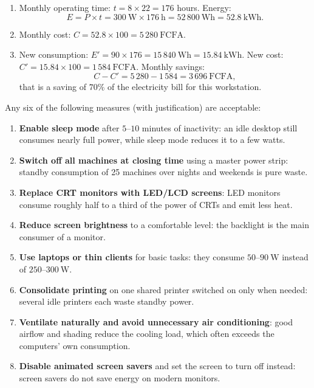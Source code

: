\documentclass[11pt]{article}
\begin{document}
\begin{corrige}
\begin{enumerate}
\item Monthly operating time: $t = 8 \times 22 = 176$ hours. Energy:
\[ E = P \times t = 300\ \mathrm{W} \times 176\ \mathrm{h} = 52\,800\ \mathrm{Wh} = 52.8\ \mathrm{kWh}. \]
\item Monthly cost: $C = 52.8 \times 100 = 5\,280\ \mathrm{FCFA}$.
\item New consumption: $E' = 90 \times 176 = 15\,840\ \mathrm{Wh} = 15.84\ \mathrm{kWh}$. New cost: $C' = 15.84 \times 100 = 1\,584\ \mathrm{FCFA}$. Monthly savings:
\[ C - C' = 5\,280 - 1\,584 = 3\,696\ \mathrm{FCFA}, \]
that is a saving of $70\%$ of the electricity bill for this workstation.
\end{enumerate}
\end{corrige}

\begin{corrige}
Any six of the following measures (with justification) are acceptable:
\begin{enumerate}
\item \textbf{Enable sleep mode} after $5$--$10$ minutes of inactivity: an idle desktop still consumes nearly full power, while sleep mode reduces it to a few watts.
\item \textbf{Switch off all machines at closing time} using a master power strip: standby consumption of 25 machines over nights and weekends is pure waste.
\item \textbf{Replace CRT monitors with LED/LCD screens}: LED monitors consume roughly half to a third of the power of CRTs and emit less heat.
\item \textbf{Reduce screen brightness} to a comfortable level: the backlight is the main consumer of a monitor.
\item \textbf{Use laptops or thin clients} for basic tasks: they consume $50$--$90\ \mathrm{W}$ instead of $250$--$300\ \mathrm{W}$.
\item \textbf{Consolidate printing} on one shared printer switched on only when needed: several idle printers each waste standby power.
\item \textbf{Ventilate naturally and avoid unnecessary air conditioning}: good airflow and shading reduce the cooling load, which often exceeds the computers' own consumption.
\item \textbf{Disable animated screen savers} and set the screen to turn off instead: screen savers do not save energy on modern monitors.
\end{enumerate}
\end{corrige}
\end{document}
